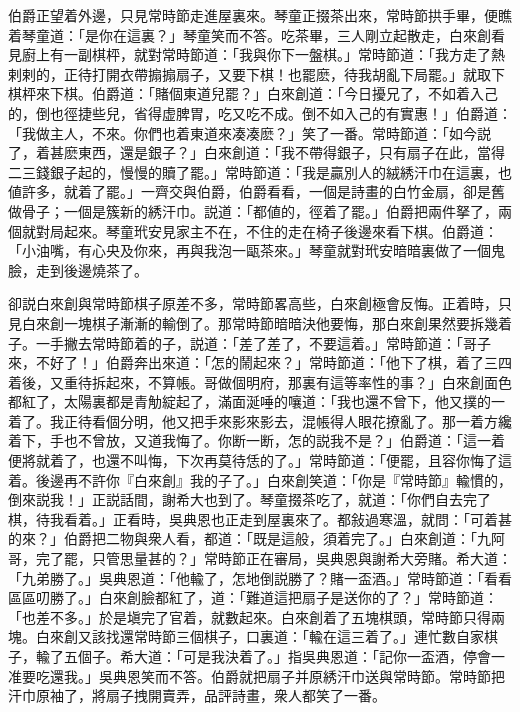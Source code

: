 伯爵正望着外邊，只見常時節走進屋裏來。琴童正掇茶出來，常時節拱手畢，便瞧着琴童道：「是你在這裏？」琴童笑而不答。吃茶畢，三人剛立起散走，白來創看見廚上有一副棋枰，就對常時節道：「我與你下一盤棋。」常時節道：「我方走了熱剌剌的，正待打開衣帶搧搧扇子，又要下棋！也罷麽，待我胡亂下局罷。」就取下棋枰來下棋。伯爵道：「賭個東道兒罷？」白來創道：「今日擾兄了，不如着入己的，倒也徑捷些兒，省得虚脾胃，吃又吃不成。倒不如入己的有實惠！」伯爵道：「我做主人，不來。你們也着東道來凑凑麽？」笑了一番。常時節道：「如今説了，着甚麽東西，還是銀子？」白來創道：「我不帶得銀子，只有扇子在此，當得二三錢銀子起的，慢慢的贖了罷。」常時節道：「我是贏別人的絨綉汗巾在這裏，也値許多，就着了罷。」一齊交與伯爵，伯爵看看，一個是詩畫的白竹金扇，卻是舊做骨子；一個是簇新的綉汗巾。説道：「都値的，徑着了罷。」伯爵把兩件拏了，兩個就對局起來。琴童玳安見家主不在，不住的走在椅子後邊來看下棋。伯爵道：「小油嘴，有心央及你來，再與我泡一甌茶來。」琴童就對玳安暗暗裏做了一個鬼臉，走到後邊燒茶了。

卻説白來創與常時節棋子原差不多，常時節畧高些，白來創極會反悔。正着時，只見白來創一塊棋子漸漸的輸倒了。那常時節暗暗決他要悔，那白來創果然要拆幾着子。一手撇去常時節着的子，説道：「差了差了，不要這着。」常時節道：「哥子來，不好了！」伯爵奔出來道：「怎的鬧起來？」常時節道：「他下了棋，着了三四着後，又重待拆起來，不算帳。哥做個明府，那裏有這等率性的事？」白來創面色都紅了，太陽裏都是青觔綻起了，滿面涎唾的嚷道：「我也還不曾下，他又撲的一着了。我正待看個分明，他又把手來影來影去，混帳得人眼花撩亂了。那一着方纔着下，手也不曾放，又道我悔了。你断一断，怎的説我不是？」伯爵道：「這一着便將就着了，也還不叫悔，下次再莫待恁的了。」常時節道：「便罷，且容你悔了這着。後邊再不許你『白來創』我的子了。」白來創笑道：「你是『常時節』輸慣的，倒來説我！」正説話間，謝希大也到了。琴童掇茶吃了，就道：「你們自去完了棋，待我看着。」正看時，吳典恩也正走到屋裏來了。都敍過寒溫，就問：「可着甚的來？」伯爵把二物與衆人看，都道：「既是這般，須着完了。」白來創道：「九阿哥，完了罷，只管思量甚的？」常時節正在審局，吳典恩與謝希大旁賭。希大道：「九弟勝了。」吳典恩道：「他輸了，怎地倒説勝了？賭一盃酒。」常時節道：「看看區區叨勝了。」白來創臉都紅了，道：「難道這把扇子是送你的了？」常時節道：「也差不多。」於是塡完了官着，就數起來。白來創着了五塊棋頭，常時節只得兩塊。白來創又該找還常時節三個棋子，口裏道：「輸在這三着了。」連忙數自家棋子，輸了五個子。希大道：「可是我決着了。」指吳典恩道：「記你一盃酒，停會一准要吃還我。」吳典恩笑而不答。伯爵就把扇子并原綉汗巾送與常時節。常時節把汗巾原袖了，將扇子拽開賣弄，品評詩畫，衆人都笑了一番。

